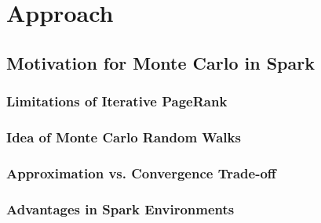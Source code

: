 \section{Approach}
\subsection{Motivation for Monte Carlo in Spark}
\subsubsection{Limitations of Iterative PageRank}
\subsubsection{Idea of Monte Carlo Random Walks}
\subsubsection{Approximation vs. Convergence Trade-off}
\subsubsection{Advantages in Spark Environments}

